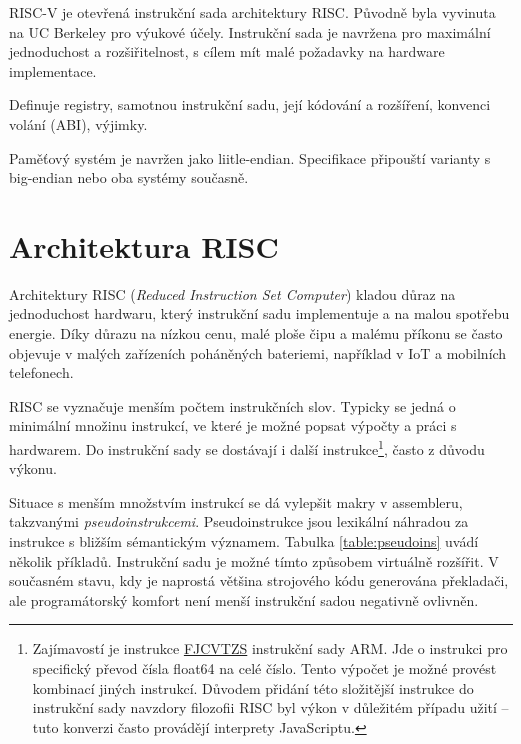 RISC-V je otevřená instrukční sada architektury RISC.
Původně byla vyvinuta na UC Berkeley pro výukové účely.
Instrukční sada je navržena pro maximální jednoduchost a rozšiřitelnost, s cílem mít malé požadavky na hardware implementace.
\cite{riscvspec}

Definuje registry, samotnou instrukční sadu, její kódování a rozšíření, konvenci volání (ABI), výjimky.

Paměťový systém je navržen jako liitle-endian.
Specifikace připouští varianty s big-endian nebo oba systémy současně.


\section{Architektura RISC}

Architektury RISC (\emph{Reduced Instruction Set Computer}) kladou důraz na jednoduchost hardwaru, který instrukční sadu implementuje a na malou spotřebu energie.
Díky důrazu na nízkou cenu, malé ploše čipu a malému příkonu se často objevuje v malých zařízeních poháněných bateriemi, například v IoT a mobilních telefonech.

RISC se vyznačuje menším počtem instrukčních slov.
Typicky se jedná o minimální množinu instrukcí, ve které je možné popsat výpočty a práci s hardwarem.
Do instrukční sady se dostávají i další instrukce\footnote{Zajímavostí je instrukce \href{https://developer.arm.com/documentation/dui0801/h/A64-Floating-point-Instructions/FJCVTZS}{FJCVTZS} instrukční sady ARM. Jde o instrukci pro specifický převod čísla float64 na celé číslo. Tento výpočet je možné provést kombinací jiných instrukcí. Důvodem přidání této složitější instrukce do instrukční sady navzdory filozofii RISC byl výkon v důležitém případu užití -- tuto konverzi často provádějí interprety JavaScriptu.}, často z důvodu výkonu.

Situace s menším množstvím instrukcí se dá vylepšit makry v assembleru, takzvanými \emph{pseudoinstrukcemi}.
Pseudoinstrukce jsou lexikální náhradou za instrukce s bližším sémantickým významem.
Tabulka \ref{table:pseudoins} uvádí několik příkladů.
Instrukční sadu je možné tímto způsobem virtuálně rozšířit.
V současném stavu, kdy je naprostá většina strojového kódu generována překladači, ale programátorský komfort není menší instrukční sadou negativně ovlivněn.

